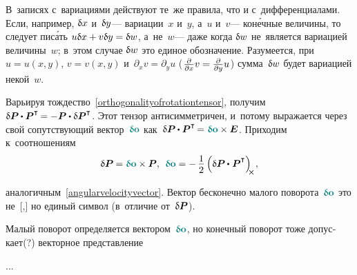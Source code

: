 \begin{otherlanguage}{russian}
{\par}



В~записях с~вариациями действуют те~же правила, что и с~дифференциалами. Если, например, ${\updelta\hspace{-0.1ex}x}$ и~${\updelta\hspace{-0.1ex}y}$\:--- вариации~$x$ и~$y$, а~$u$ и~$v$\:--- кон\'{е}чные величины, то следует пис\'{а}ть ${u \updelta\hspace{-0.1ex}x + v \updelta\hspace{-0.1ex}y = \updelta\hspace{-0.1ex}w}$, а~не~$w$\:--- даже когда ${\updelta\hspace{-0.1ex}w}$ не~является вариацией величины~$w$; в~этом случае ${\updelta\hspace{-0.1ex}w}$ это единое обозначение. Разумеется, при~${u \!=\! u(x,y)}$, ${v \!=\! v(x,y)}$ и~${\partial_x v = \partial_y u}$ (${\hspace{0.16ex}\frac{\partial}{\partial x} v = \frac{\partial}{\partial y} u\hspace{0.16ex}}$) сумма~${\updelta\hspace{-0.1ex}w}$ будет вариацией некой~$w$.

Варьируя тождество~\eqref{orthogonalityofrotationtensor}, получим ${\variation{\bm{P}} \hspace{-0.08ex} \dotp \bm{P}^{\T} \hspace{-0.2ex} = - \bm{P} \dotp \variation{\bm{P}}^{\T}}$\!. Этот тензор антисимметричен, и~потому выражается через свой сопутствующий вектор~${\varvector{o}}$ как~${\variation{\bm{P}} \hspace{-0.08ex} \dotp \bm{P}^{\T} \hspace{-0.25ex} = \hspace{0.1ex} \varvector{o} \times \bm{E}}$. Приходим к~соотношениям
\vspace{-0.4em}\begin{equation}
\variation{\bm{P}} \hspace{-0.1ex} = \varvector{o} \times \bm{P} , \:\:
\varvector{o} = - \, \displaystyle \onehalf \left( { \variation{\bm{P}} \hspace{-0.08ex} \dotp^{\mathstrut} \bm{P}^{\T} } \right)_{\hspace{-0.25em}\Xcompanion} \hspace{-0.1ex} ,
\end{equation}

\vspace{-0.5em} \noindent аналогичным~\eqref{angularvelocityvector}. Вектор бесконечно малого поворота~${\varvector{o}}$ это не~[,] но единый символ (в~отличие от~${\updelta\hspace{-0.1ex}\bm{P}}$).

Малый поворот определяется вектором~${\varvector{o}}$, но конечный поворот тоже допускает(?) векторное представление

...



\end{otherlanguage}

